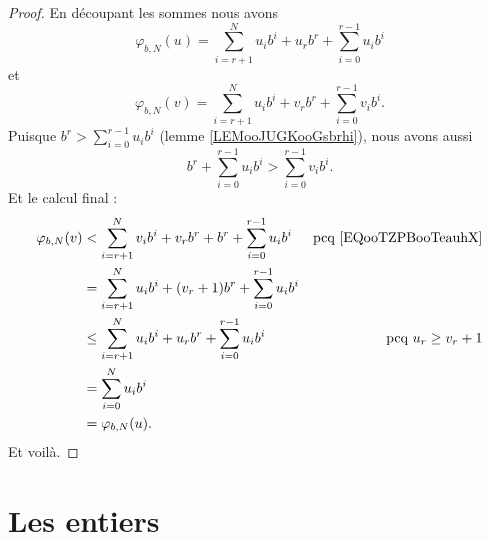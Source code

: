 \begin{proof}
	En découpant les sommes nous avons
	\begin{equation}
		\varphi_{b,N}(u)=\sum_{i=r+1}^Nu_ib^i+u_rb^r+\sum_{i=0}^{r-1}u_ib^i
	\end{equation}
	et
	\begin{equation}
		\varphi_{b,N}(v)=\sum_{i=r+1}^Nu_ib^i+v_rb^r+\sum_{i=0}^{r-1}v_ib^i.
	\end{equation}
	Puisque \( b^r>\sum_{i=0}^{r-1}u_ib^i\) (lemme \ref{LEMooJUGKooGsbrhi}), nous avons aussi
	\begin{equation}        \label{EQooTZPBooTeauhX}
		b^r+\sum_{i=0}^{r-1}u_ib^i>\sum_{i=0}^{r-1}v_ib^i.
	\end{equation}
	Et le calcul final :
	\begin{subequations}
		\begin{align}
			\varphi_{b,N}(v) & <   \sum_{i=r+1}^Nv_ib^i+v_rb^r+b^r+\sum_{i=0}^{r-1}u_ib^i & \text{pcq \eqref{EQooTZPBooTeauhX}} \\
			                 & =   \sum_{i=r+1}^Nu_ib^i+(v_r+1)b^r+\sum_{i=0}^{r-1}u_ib^i                                       \\
			                 & \leq  \sum_{i=r+1}^Nu_ib^i+u_rb^r+\sum_{i=0}^{r-1}u_ib^i   & \text{pcq } u_r\geq v_r+1           \\
			                 & =   \sum_{i=0}^Nu_ib^i                                                                           \\
			                 & =   \varphi_{b,N}(u).
		\end{align}
	\end{subequations}
	Et voilà.
\end{proof}

\section{Les entiers}
\label{SECooNombresEntiers}


